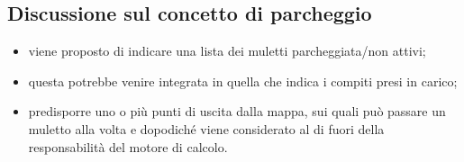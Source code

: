 \subsection{Discussione sul concetto di parcheggio}
\label{park}
    \begin{itemize}
        \item viene proposto di indicare una lista dei muletti parcheggiata/non attivi;
        \item questa potrebbe venire integrata in quella che indica i compiti presi in carico;
        \item predisporre uno o più punti di uscita dalla mappa, sui quali può passare un muletto alla volta e dopodiché viene considerato al di fuori della responsabilità del motore di calcolo.
    \end{itemize}












